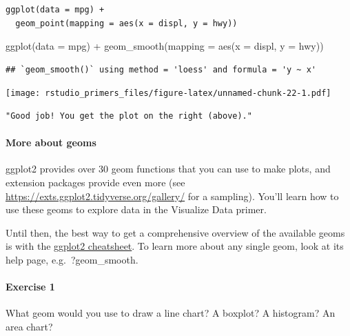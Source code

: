 \documentclass[
]{article}
\newenvironment{Shaded}{\begin{snugshade}}{\end{snugshade}}
\newcommand{\AttributeTok}[1]{\textcolor[rgb]{0.77,0.63,0.00}{#1}}
\newcommand{\FunctionTok}[1]{\textcolor[rgb]{0.00,0.00,0.00}{#1}}
\newcommand{\NormalTok}[1]{#1}
\newcommand{\SpecialCharTok}[1]{\textcolor[rgb]{0.00,0.00,0.00}{#1}}
\begin{document}
\begin{verbatim}
ggplot(data = mpg) + 
  geom_point(mapping = aes(x = displ, y = hwy))
\end{verbatim}

\begin{Shaded}
\begin{Highlighting}[]
\FunctionTok{ggplot}\NormalTok{(}\AttributeTok{data =}\NormalTok{ mpg) }\SpecialCharTok{+} 
  \FunctionTok{geom\_smooth}\NormalTok{(}\AttributeTok{mapping =} \FunctionTok{aes}\NormalTok{(}\AttributeTok{x =}\NormalTok{ displ, }\AttributeTok{y =}\NormalTok{ hwy))}
\end{Highlighting}
\end{Shaded}

\begin{verbatim}
## `geom_smooth()` using method = 'loess' and formula = 'y ~ x'
\end{verbatim}

\texttt{[image: rstudio\_primers\_files/figure-latex/unnamed-chunk-22-1.pdf]}

\begin{verbatim}
"Good job! You get the plot on the right (above)."
\end{verbatim}

\hypertarget{more-about-geoms}{%
\paragraph{More about geoms}\label{more-about-geoms}}

ggplot2 provides over 30 geom functions that you can use to make plots,
and extension packages provide even more (see
\url{https://exts.ggplot2.tidyverse.org/gallery/} for a sampling).
You'll learn how to use these geoms to explore data in the Visualize
Data primer.

Until then, the best way to get a comprehensive overview of the
available geoms is with the
\href{https://www.rstudio.com/wp-content/uploads/2016/11/ggplot2-cheatsheet-2.1.pdf}{ggplot2
cheatsheet}. To learn more about any single geom, look at its help page,
e.g.~?geom\_smooth.

\hypertarget{exercise-1-2}{%
\paragraph{Exercise 1}\label{exercise-1-2}}

What geom would you use to draw a line chart? A boxplot? A histogram? An
area chart?
\end{document}
